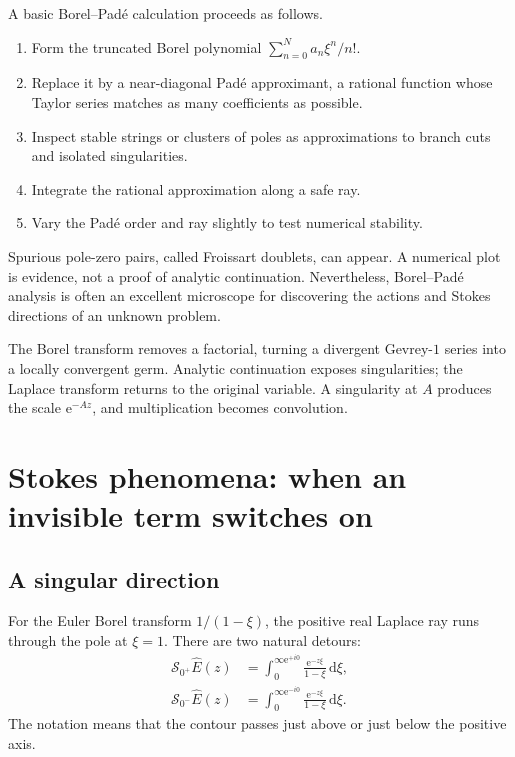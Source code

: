 \documentclass[11pt,oneside]{book}
\theoremstyle{definition}
\theoremstyle{remark}
\newcommand{\e}{\mathrm{e}}
\newcommand{\dd}{\,\mathrm{d}}
\begin{document}
\begin{recipebox}
A basic Borel--Pad\'e calculation proceeds as follows.
\begin{enumerate}
\item Form the truncated Borel polynomial
$\sum_{n=0}^N a_n\xi^n/n!$.
\item Replace it by a near-diagonal Pad\'e approximant, a rational function whose
Taylor series matches as many coefficients as possible.
\item Inspect stable strings or clusters of poles as approximations to branch
cuts and isolated singularities.
\item Integrate the rational approximation along a safe ray.
\item Vary the Pad\'e order and ray slightly to test numerical stability.
\end{enumerate}
\end{recipebox}

Spurious pole-zero pairs, called Froissart doublets, can appear. A numerical plot
is evidence, not a proof of analytic continuation. Nevertheless, Borel--Pad\'e
analysis is often an excellent microscope for discovering the actions and
Stokes directions of an unknown problem.

\begin{summarybox}
The Borel transform removes a factorial, turning a divergent Gevrey-$1$ series
into a locally convergent germ. Analytic continuation exposes singularities;
the Laplace transform returns to the original variable. A singularity at $A$
produces the scale $\e^{-Az}$, and multiplication becomes convolution.
\end{summarybox}


\chapter{Stokes phenomena: when an invisible term switches on}
\label{ch:stokes}

\section{A singular direction}

For the Euler Borel transform $1/(1-\xi)$, the positive real Laplace ray runs
through the pole at $\xi=1$. There are two natural detours:
\begin{align}
  \mathcal S_{0^+}\widehat E(z)
   &=\int_{0}^{\infty\e^{+i0}}
      \frac{\e^{-z\xi}}{1-\xi}\dd\xi,\\
  \mathcal S_{0^-}\widehat E(z)
   &=\int_{0}^{\infty\e^{-i0}}
      \frac{\e^{-z\xi}}{1-\xi}\dd\xi.
  \label{eq:euler-lateral-sums}
\end{align}
The notation means that the contour passes just above or just below the positive
axis.
\end{document}

